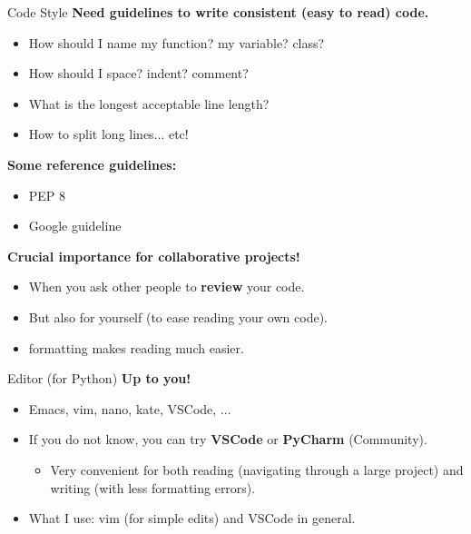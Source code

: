 \begin{frame}{Code Style}
\vspace{-3mm}
\textbf{Need guidelines to write consistent (easy to read) code.}
\begin{itemize}
\item How should I name my function? my variable? class?
\item How should I space? indent? comment?
\item What is the longest acceptable line length?\\
\item How to split long lines... etc!
\end{itemize}
\vsp
\textbf{Some reference guidelines:}\\
\begin{itemize}
\item PEP 8
\item Google guideline
\end{itemize}
\vsp
\textbf{Crucial importance for collaborative projects!}\\
\begin{itemize}
\item When you ask other people to \textbf{review} your code.
\item But also for yourself (to ease reading your own code).\\
\item {} formatting makes reading much easier.
\end{itemize}
\end{frame}

\begin{frame}{Editor (for Python)}
\textbf{Up to you!}
\begin{itemize}
\item Emacs, vim, nano, kate, VSCode, ...\\
\item If you do not know, you can try \textbf{VSCode} or \textbf{PyCharm} (Community).
\begin{itemize}
\item Very convenient for both reading (navigating through a large project) and writing (with less formatting errors).
\end{itemize}
\item What I use: vim (for simple edits) and VSCode in general.
\end{itemize}
\end{frame}

